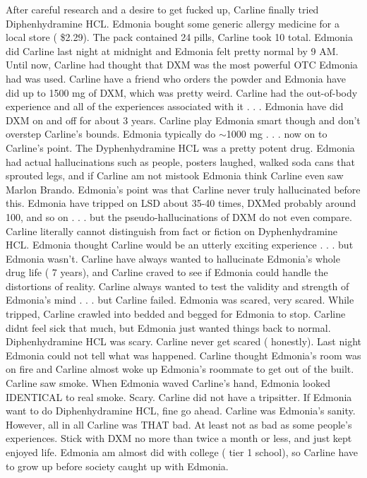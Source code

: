 \documentclass[12pt]{book}
\begin{document}
After careful research and a desire to get fucked up, Carline finally tried Diphenhydramine HCL. Edmonia bought some generic allergy medicine for a local store ( \$2.29). The pack contained 24 pills, Carline took 10 total. Edmonia did Carline last night at midnight and Edmonia felt pretty normal by 9 AM. Until now, Carline had thought that DXM was the most powerful OTC Edmonia had was used. Carline have a friend who orders the powder and Edmonia have did up to 1500 mg of DXM, which was pretty weird. Carline had the out-of-body experience and all of the experiences associated with it . . .  Edmonia have did DXM on and off for about 3 years. Carline play Edmonia smart though and don't overstep Carline's bounds. Edmonia typically do $\sim$1000 mg . . .  now on to Carline's point. The Dyphenhydramine HCL was a pretty potent drug. Edmonia had actual hallucinations such as people, posters laughed, walked soda cans that sprouted legs, and if Carline am not mistook Edmonia think Carline even saw Marlon Brando. Edmonia's point was that Carline never truly hallucinated before this. Edmonia have tripped on LSD about 35-40 times, DXMed probably around 100, and so on . . .  but the pseudo-hallucinations of DXM do not even compare. Carline literally cannot distinguish from fact or fiction on Dyphenhydramine HCL. Edmonia thought Carline would be an utterly exciting experience . . .  but Edmonia wasn't. Carline have always wanted to hallucinate Edmonia's whole drug life ( 7 years), and Carline craved to see if Edmonia could handle the distortions of reality. Carline always wanted to test the validity and strength of Edmonia's mind . . .  but Carline failed. Edmonia was scared, very scared. While tripped, Carline crawled into bedded and begged for Edmonia to stop. Carline didnt feel sick that much, but Edmonia just wanted things back to normal. Diphenhydramine HCL was scary. Carline never get scared ( honestly). Last night Edmonia could not tell what was happened. Carline thought Edmonia's room was on fire and Carline almost woke up Edmonia's roommate to get out of the built. Carline saw smoke. When Edmonia waved Carline's hand, Edmonia looked IDENTICAL to real smoke. Scary. Carline did not have a tripsitter. If Edmonia want to do Diphenhydramine HCL, fine go ahead. Carline was Edmonia's sanity. However, all in all Carline was THAT bad. At least not as bad as some people's experiences. Stick with DXM no more than twice a month or less, and just kept enjoyed life. Edmonia am almost did with college ( tier 1 school), so Carline have to grow up before society caught up with Edmonia.
\end{document}

